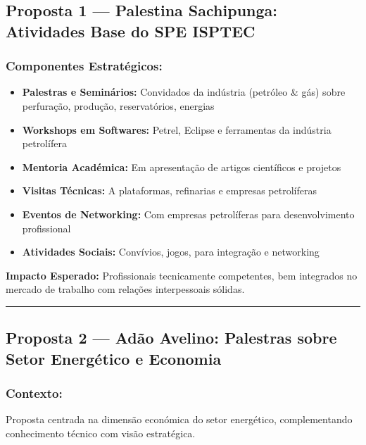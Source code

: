\documentclass[12pt,a4paper]{article}
\begin{document}
\subsection{Proposta 1 — Palestina Sachipunga: Atividades Base do SPE ISPTEC}

\subsubsection*{Componentes Estratégicos:}

\begin{itemize}[itemsep=0.2cm]
    \item \textbf{Palestras e Seminários:} Convidados da indústria (petróleo \& gás) sobre perfuração, produção, reservatórios, energias
    
    \item \textbf{Workshops em Softwares:} Petrel, Eclipse e ferramentas da indústria petrolífera
    
    \item \textbf{Mentoria Académica:} Em apresentação de artigos científicos e projetos
    
    \item \textbf{Visitas Técnicas:} A plataformas, refinarias e empresas petrolíferas
    
    \item \textbf{Eventos de Networking:} Com empresas petrolíferas para desenvolvimento profissional
    
    \item \textbf{Atividades Sociais:} Convívios, jogos, para integração e networking
\end{itemize}

\textbf{Impacto Esperado:} Profissionais tecnicamente competentes, bem integrados no mercado de trabalho com relações interpessoais sólidas.

\textcolor{spe-secondary}{\hspace{0.5cm}\rule{0.4\linewidth}{0.8pt}}

\subsection{Proposta 2 — Adão Avelino: Palestras sobre Setor Energético e Economia}

\subsubsection*{Contexto:}
Proposta centrada na dimensão económica do setor energético, complementando conhecimento técnico com visão estratégica.
\end{document}
